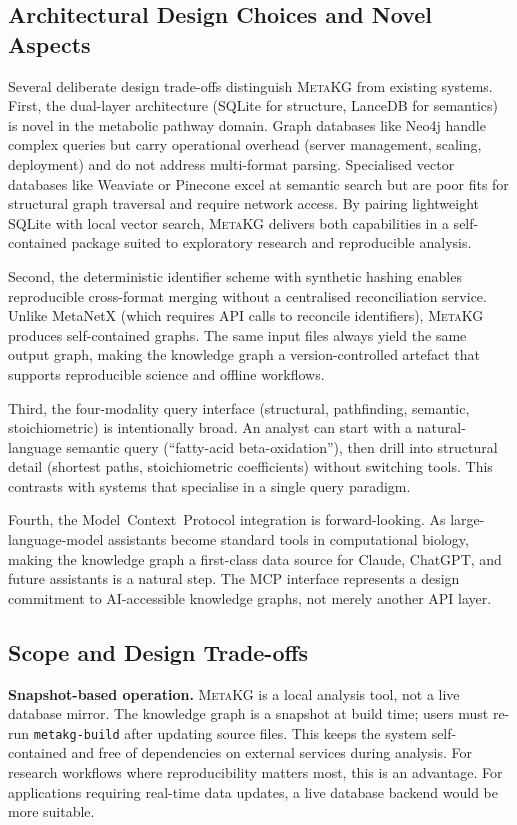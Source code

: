 \documentclass[10pt]{article}
\begin{document}
\subsection{Architectural Design Choices and Novel Aspects}

Several deliberate design trade-offs distinguish \textsc{MetaKG} from existing
systems. First, the dual-layer architecture (SQLite for structure, LanceDB for
semantics) is novel in the metabolic pathway domain. Graph databases like
Neo4j handle complex queries but carry operational overhead (server
management, scaling, deployment) and do not address multi-format parsing.
Specialised vector databases like Weaviate or Pinecone excel at semantic
search but are poor fits for structural graph traversal and require network
access. By pairing lightweight SQLite with local vector search,
\textsc{MetaKG} delivers both capabilities in a self-contained package suited
to exploratory research and reproducible analysis.

Second, the deterministic identifier scheme with synthetic hashing enables
reproducible cross-format merging without a centralised reconciliation
service. Unlike MetaNetX (which requires API calls to reconcile identifiers),
\textsc{MetaKG} produces self-contained graphs. The same input files always
yield the same output graph, making the knowledge graph a version-controlled
artefact that supports reproducible science and offline workflows.

Third, the four-modality query interface (structural, pathfinding, semantic,
stoichiometric) is intentionally broad. An analyst can start with a
natural-language semantic query (``fatty-acid beta-oxidation''), then drill
into structural detail (shortest paths, stoichiometric coefficients) without
switching tools. This contrasts with systems that specialise in a single query
paradigm.

Fourth, the Model~Context~Protocol integration is forward-looking. As
large-language-model assistants become standard tools in computational biology,
making the knowledge graph a first-class data source for Claude, ChatGPT, and
future assistants is a natural step. The MCP interface represents a design
commitment to AI-accessible knowledge graphs, not merely another API layer.

\subsection{Scope and Design Trade-offs}

\textbf{Snapshot-based operation.} \textsc{MetaKG} is a local analysis tool,
not a live database mirror. The knowledge graph is a snapshot at build time;
users must re-run \texttt{metakg-build} after updating source files. This
keeps the system self-contained and free of dependencies on external services
during analysis. For research workflows where reproducibility matters most,
this is an advantage. For applications requiring real-time data updates, a
live database backend would be more suitable.
\end{document}
